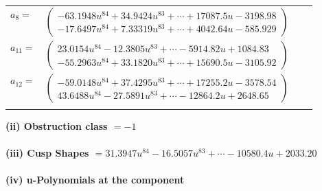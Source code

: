 \documentclass[1p]{elsarticle_modified}
\theoremstyle{definition}
\begin{document}
\begin{tabular}{m{7pt} m{180pt} m{7pt} m{180pt} }
\flushright $a_{8}=$&$\begin{pmatrix}-63.1948 u^{84}+34.9424 u^{83}+\cdots+17087.5 u-3198.98\\-17.6497 u^{84}+7.33319 u^{83}+\cdots+4042.64 u-585.929\end{pmatrix}$ \\
\flushright $a_{11}=$&$\begin{pmatrix}23.0154 u^{84}-12.3805 u^{83}+\cdots-5914.82 u+1084.83\\-55.2963 u^{84}+33.1820 u^{83}+\cdots+15690.5 u-3105.92\end{pmatrix}$ \\
\flushright $a_{12}=$&$\begin{pmatrix}-59.0148 u^{84}+37.4295 u^{83}+\cdots+17255.2 u-3578.54\\43.6488 u^{84}-27.5891 u^{83}+\cdots-12864.2 u+2648.65\end{pmatrix}$\\&\end{tabular}
\flushleft \textbf{(ii) Obstruction class $= -1$}\\~\\
\flushleft \textbf{(iii) Cusp Shapes $= 31.3947 u^{84}-16.5057 u^{83}+\cdots-10580.4 u+2033.20$}\\~\\
\newpage\renewcommand{\arraystretch}{1}
\flushleft \textbf{(iv) u-Polynomials at the component}\newline \\
\end{document}
